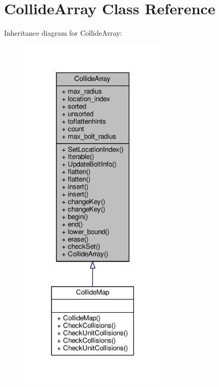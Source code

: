 \hypertarget{classCollideArray}{}\section{Collide\+Array Class Reference}
\label{classCollideArray}


Inheritance diagram for Collide\+Array\+:
\nopagebreak
\begin{figure}[H]
\begin{center}
\leavevmode
\includegraphics[width=201pt]{d3/dce/classCollideArray__inherit__graph}
\end{center}
\end{figure}


